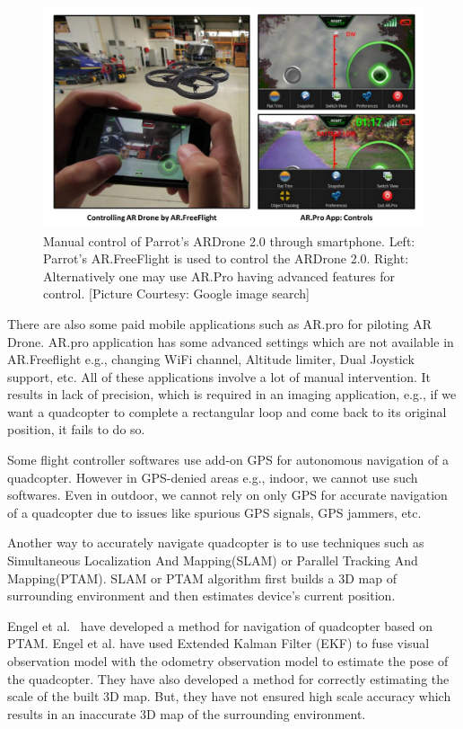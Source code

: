 \begin{figure}[h!]
  \includegraphics[width=\textwidth]{figures/manualControl}
   \caption[Manual control of Parrot's ARDrone 2.0]{Manual control of Parrot's
  ARDrone 2.0 through smartphone. Left: Parrot's AR.FreeFlight is used to
  control the ARDrone 2.0. 
  Right: Alternatively one may use AR.Pro having advanced features for control.
  [Picture Courtesy: Google image search]}
   \label{fig:manualControl}
\end{figure}

There are also some paid mobile applications such as AR.pro for piloting AR
Drone. AR.pro application has some advanced settings which are not available in
AR.Freeflight e.g., changing WiFi channel, Altitude limiter, Dual Joystick support, etc. All of
these applications involve a lot of manual intervention.  It results in lack of
precision, which is required in an imaging application, e.g., if we want a
quadcopter to complete a rectangular loop and come back to its original
position, it fails to do so.

Some flight controller softwares use add-on GPS for autonomous navigation of
a quadcopter. However in GPS-denied areas e.g., indoor, we cannot use such
softwares. Even in outdoor, we cannot rely on only GPS for accurate
navigation of a quadcopter due to issues like spurious GPS signals, GPS jammers,
etc.

Another way to accurately navigate quadcopter is to use techniques such as
Simultaneous Localization And Mapping(SLAM)\cite{Davison:2007} or Parallel Tracking And
Mapping(PTAM)\cite{klein}. SLAM or PTAM algorithm first builds a 3D map of
surrounding environment and then estimates device's current position.

Engel et al.~\cite{Engel12} have developed a method for navigation of quadcopter
based on PTAM\cite{klein}. Engel et al. have used Extended Kalman Filter (EKF)
to fuse visual observation model with the odometry observation model to estimate
the pose of the quadcopter. They have also developed a method for
correctly estimating the scale of the built 3D map. But, they have not ensured
high scale accuracy which results in an inaccurate 3D map of
the surrounding environment.

